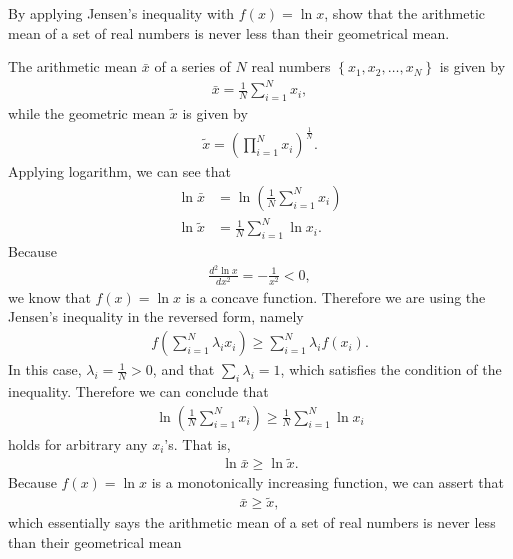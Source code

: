 \begin{question}{1.40}
	By applying Jensen’s inequality  with $f(x) = \ln x$, show that the arithmetic mean of a set of real numbers is never less than their geometrical mean.
\end{question}

\begin{answer}{}
	The arithmetic mean $\bar{x}$ of a series of $N$ real numbers $\left\{ x_1, x_2, \ldots, x_N \right\}$ is given by
	\begin{align}
		\bar{x} = \frac{1}{N} \sum_{i = 1}^{N} x_i,
	\end{align}
	while the geometric mean $\tilde{x}$ is given by
	\begin{align}
		\tilde{x} = \left( \prod_{i = 1}^{N} x_i \right) ^{\frac{1}{N}}.
	\end{align}
	Applying logarithm, we can see that
	\begin{align}
		\ln \bar{x} &= \ln \left( \frac{1}{N} \sum_{i = 1}^{N} x_i \right)\\
		\ln \tilde{x} &= \frac{1}{N} \sum_{i = 1}^{N} \ln x_i.
	\end{align}
	Because
	\begin{align}
		\frac{d^2 \ln x}{dx^2} = -\frac{1}{x^2} < 0,
	\end{align}
	we know that $f(x) = \ln x$ is a concave function. Therefore we are using the Jensen's inequality in the reversed form, namely
	\begin{align}
		f\left( \sum_{i = 1}^{N} \lambda_i x_i \right) \geq \sum_{i = 1}^{N} \lambda_i f(x_i).
	\end{align}
	In this case, $\lambda_i = \frac{1}{N} > 0$, and that $\sum_{i} \lambda_i = 1$, which satisfies the condition of the inequality. Therefore we can conclude that
	\begin{align}
		\ln \left( \frac{1}{N} \sum_{i = 1}^{N} x_i \right) \geq \frac{1}{N} \sum_{i = 1}^{N} \ln x_i
	\end{align}
	holds for arbitrary any $x_i$'s. That is, 
	\begin{align}
		\ln \bar{x} \geq \ln \tilde{x}.
	\end{align}
	Because $f(x) = \ln x$ is a monotonically increasing function, we can assert that
	\begin{align}
		\bar{x} \geq \tilde{x},
	\end{align}
	which essentially says the arithmetic mean of a set of real numbers is never less than their geometrical mean
\end{answer}